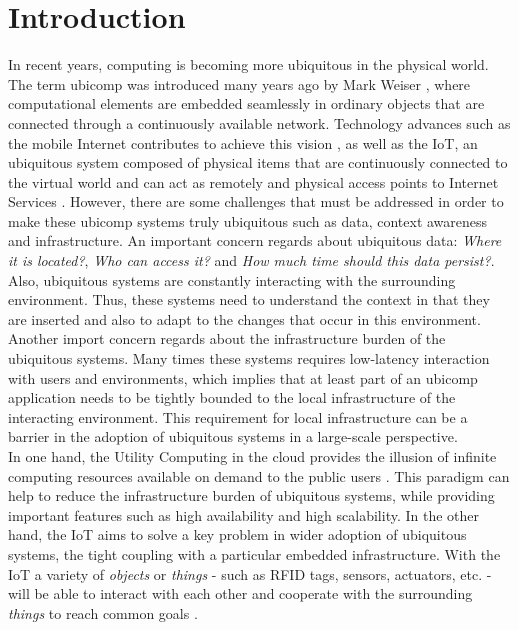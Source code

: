 
\chapter{Introduction}
\label{chapter:introduction}
In recent years, computing is becoming more ubiquitous in the physical world. The term \gls{ubicomp}
was introduced many years ago by Mark Weiser \cite{weiser1991computer}, where computational elements
are embedded seamlessly in ordinary objects that are connected through a continuously available network.
Technology advances such as the mobile Internet contributes to achieve this vision \cite{gubbi2013internet},
as well as the \gls{IoT}, an ubiquitous system composed of physical items that are continuously connected
to the virtual world and can act as remotely and physical access points to Internet Services \cite{mattern2010internet}.
However, there are some challenges that must be addressed in order to make these \gls{ubicomp} systems truly
ubiquitous \cite{caceres2012ubicomp} such as data, context awareness and infrastructure. An important
concern regards about ubiquitous data: \textit{Where it is located?}, \textit{Who can access it?} and
\textit{How much time should this data persist?}. Also, ubiquitous systems are constantly interacting
with the surrounding environment. Thus, these systems need to understand the context in that they are
inserted and also to adapt to the changes that occur in this environment. Another import concern regards
about the infrastructure burden of the ubiquitous systems. Many times these systems requires low-latency
interaction with users and environments, which implies that at least part of an \gls{ubicomp} application
needs to be tightly bounded to the local infrastructure of the interacting environment. This requirement
for local infrastructure can be a barrier in the adoption of ubiquitous systems in a large-scale perspective.\\

In one hand, the Utility Computing in the cloud provides the illusion of infinite computing resources
available on demand to the public users \cite{armbrust2010view}. This paradigm can help to reduce the
infrastructure burden of ubiquitous systems, while providing important features such as high availability
and high scalability. In the other hand, the \gls{IoT} aims to solve a key problem in wider adoption
of ubiquitous systems, the tight coupling with a particular embedded infrastructure. With the \gls{IoT}
a variety of \textit{objects} or \textit{things} - such as \gls{RFID} tags, sensors, actuators, etc.
- will be able to interact with each other and cooperate with the surrounding \textit{things} to reach
common goals \cite{atzori2010internet}.\\

